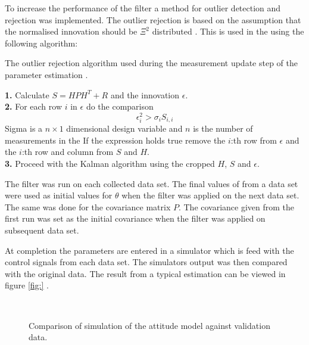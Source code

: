 To increase the performance of the filter a method for outlier detection and rejection was implemented.
The outlier rejection is based on the assumption that the normalised innovation should be $\Xi^2$ distributed \citep{sensorfusion}. This is used in the \abbrEKF using the following algorithm:
\begin{algorithm}
\label{alg:outlier}
\caption{The outlier rejection algorithm used during the measurement update step of the parameter estimation \abbrEKF.}
\textbf{1.} Calculate $S=H P H^T + R$ and the innovation $\epsilon$.
\\
\textbf{2.} For each row $i$ in $\epsilon$ do the comparison
\begin{equation}
\epsilon_{i}^{2} > \sigma_i S_{i,i}
\end{equation}
Sigma is a $n\times1$ dimensional design variable and $n$ is the number of measurements in the \abbrEKF
If the expression holds true remove the $i$:th row from $\epsilon$ and the $i$:th row and column from $S$ and $H$.\\
\textbf{3.} Proceed with the Kalman algorithm using the cropped $H$, $S$ and $\epsilon$.
\end{algorithm}

The filter was run on each collected data set. The final values of \hat{\Theta} from a data set were used as initial values for $\theta$ when the filter was applied on the next data set. The same was done for the covariance matrix $P$. The covariance given from the first run was set as the initial covariance when the filter was applied on subsequent data set.

At completion the parameters are entered in a simulator which is feed with the control signals from each data set. The simulators output was then compared with the original data. The result from a typical estimation can be viewed in figure \ref{fig:} .
\begin{figure}[tbp]
  \centering
  \qquad
  \\
  \caption{\label{fig:velocityCompareCong}%
    Comparison of simulation of the attitude model against validation data.}
\end{figure}




